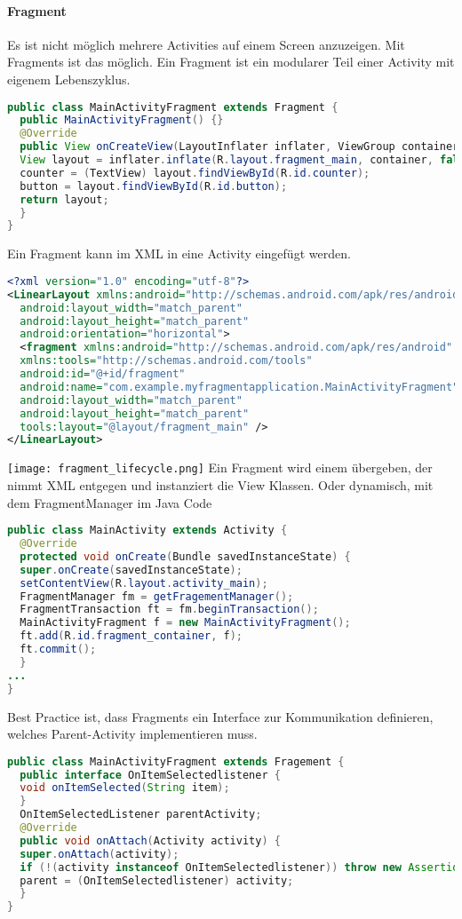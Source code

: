 \paragraph{Fragment} Es ist nicht möglich mehrere Activities auf einem Screen anzuzeigen. Mit Fragments ist das möglich. Ein Fragment ist ein modularer Teil einer Activity mit eigenem Lebenszyklus.
\begin{lstlisting}[language=java]
public class MainActivityFragment extends Fragment {
  public MainActivityFragment() {}
  @Override
  public View onCreateView(LayoutInflater inflater, ViewGroup container, Bundle savedInstanceState) {
  View layout = inflater.inflate(R.layout.fragment_main, container, false);
  counter = (TextView) layout.findViewById(R.id.counter);
  button = layout.findViewById(R.id.button);
  return layout;
  }
}
\end{lstlisting}
Ein Fragment kann im XML in eine Activity eingefügt werden.
\begin{lstlisting}[language=xml]
<?xml version="1.0" encoding="utf-8"?>
<LinearLayout xmlns:android="http://schemas.android.com/apk/res/android"
  android:layout_width="match_parent"
  android:layout_height="match_parent"
  android:orientation="horizontal">
  <fragment xmlns:android="http://schemas.android.com/apk/res/android"
  xmlns:tools="http://schemas.android.com/tools"
  android:id="@+id/fragment"
  android:name="com.example.myfragmentapplication.MainActivityFragment"
  android:layout_width="match_parent"
  android:layout_height="match_parent"
  tools:layout="@layout/fragment_main" />
</LinearLayout>
\end{lstlisting}
\texttt{[image: fragment\_lifecycle.png]}
Ein Fragment wird einem  übergeben, der nimmt XML entgegen und instanziert die View Klassen.
Oder dynamisch, mit dem FragmentManager im Java Code
\begin{lstlisting}[language=java]
public class MainActivity extends Activity {
  @Override
  protected void onCreate(Bundle savedInstanceState) {
  super.onCreate(savedInstanceState);
  setContentView(R.layout.activity_main);
  FragmentManager fm = getFragementManager();
  FragmentTransaction ft = fm.beginTransaction();
  MainActivityFragment f = new MainActivityFragment();
  ft.add(R.id.fragment_container, f);
  ft.commit();
  }
...
}
\end{lstlisting}
Best Practice ist, dass Fragments ein Interface zur Kommunikation definieren, welches Parent-Activity implementieren muss.
\begin{lstlisting}[language=java]
public class MainActivityFragment extends Fragement {
  public interface OnItemSelectedlistener {
  void onItemSelected(String item);
  }
  OnItemSelectedListener parentActivity;
  @Override
  public void onAttach(Activity activity) {
  super.onAttach(activity);
  if (!(activity instanceof OnItemSelectedlistener)) throw new AssertionError( "Activity must implement OnItemSelectedlistener!");
  parent = (OnItemSelectedlistener) activity;
  }
}
\end{lstlisting}
